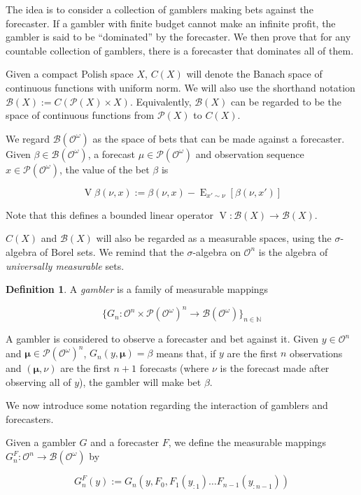 \documentclass[11pt]{article}
\theoremstyle{definition}
\newtheorem{definition}{Definition}%
\theoremstyle{plain}
\newcommand{\Nats}{\mathbb{N}}
\newcommand{\Sq}[2]{\{#1\}_{#2 \in \Nats}}
\newcommand{\Sqn}[1]{\Sq{#1}{n}}
\DeclareMathOperator{\E}{E}
\newcommand{\PM}{\mathcal{P}}
\newcommand{\Ob}{\mathcal{O}}
\newcommand{\OO}{\Ob^\omega}
\newcommand{\PMO}{\PM(\OO)}
\newcommand{\Gm}{\mathcal{B}}
\newcommand{\GMO}{\Gm(\OO)}
\DeclareMathOperator{\V}{V}
\newcommand{\BM}{\bm{\mu}}
\begin{document}
The idea is to consider a collection of gamblers making bets against the forecaster. If a gambler with finite budget cannot make an infinite profit, the gambler is said to be \enquote{dominated} by the forecaster. We then prove that for any countable collection of gamblers, there is a forecaster that dominates all of them.

Given a compact Polish space $X$, $C(X)$ will denote the Banach space of continuous functions with uniform norm. We will also use the shorthand notation $\Gm(X):=C(\PM(X) \times X)$. Equivalently, $\Gm(X)$ can be regarded to be the space of continuous functions from $\PM(X)$ to $C(X)$.

We regard $\GMO$ as the space of bets that can be made against a forecaster. Given $\beta \in \GMO$, a forecast $\mu \in \PMO$ and observation sequence $x \in \PMO$, the value of the bet $\beta$ is

\begin{equation}
\V{\beta}(\nu,x):=\beta(\nu,x) - \E_{x' \sim \nu}[\beta(\nu,x')]
\end{equation}

Note that this defines a bounded linear operator $\V: \Gm(X) \rightarrow \Gm(X)$.

$C(X)$ and $\Gm(X)$ will also be regarded as a measurable spaces, using the $\sigma$-algebra of Borel sets. We remind that the $\sigma$-algebra on $\Ob^n$ is the algebra of \emph{universally measurable} sets.

\begin{definition}

A \emph{gambler} is a family of measurable mappings

\[\Sqn{G_n : \Ob^n \times \PMO^n \rightarrow \Gm(\OO)}\]

\end{definition}

A gambler is considered to observe a forecaster and bet against it. Given $y \in \Ob^n$ and $\BM \in \PMO^n$, $G_n(y,\BM)=\beta$ means that, if $y$ are the first $n$ observations and $(\BM,\nu)$ are the first $n + 1$ forecasts (where $\nu$ is the forecast made after observing all of $y$), the gambler will make bet $\beta$.

We now introduce some notation regarding the interaction of gamblers and forecasters. 

Given a gambler $G$ and a forecaster $F$, we define the measurable mappings $G^F_n: \Ob^n \rightarrow \GMO$ by

\begin{equation}
\label{eqn:GF}
G^F_n(y):=G_n(y,F_0,F_1(y_{:1}) \ldots F_{n-1}(y_{:n-1}))
\end{equation}
\end{document}
